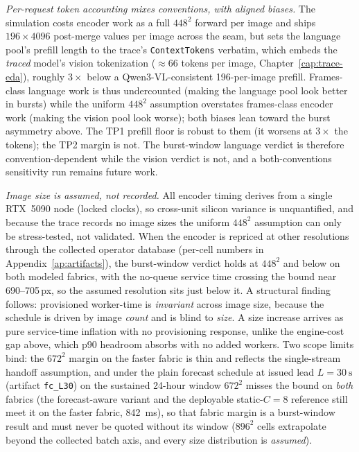 \emph{Per-request token accounting mixes conventions, with aligned biases.}
The simulation costs encoder work as a full $448^2$ forward per image and
ships $196 \times 4096$ post-merge values per image across the seam, but
sets the language pool's prefill length to the trace's
\texttt{ContextTokens} verbatim, which embeds the \emph{traced} model's
vision tokenization (${\approx}66$ tokens per image,
Chapter~\ref{cap:trace-eda}), roughly $3\times$ below a Qwen3-VL-consistent
196-per-image prefill. Frames-class language work is thus undercounted
(making the language pool look better in bursts) while the uniform $448^2$
assumption overstates frames-class encoder work (making the vision pool look
worse); both biases lean toward the burst asymmetry above. The TP1 prefill
floor is robust to them (it worsens at $3\times$ the tokens); the TP2 margin
is not. The burst-window language verdict is therefore
convention-dependent while the vision verdict is not, and a
both-conventions sensitivity run remains future work.

\emph{Image size is assumed, not recorded.} All encoder timing derives from
a single RTX~5090 node (locked clocks), so cross-unit silicon variance is
unquantified, and because the trace records no image sizes the uniform
$448^2$ assumption can only be stress-tested, not validated. When the
encoder is repriced at other resolutions through the collected operator
database (per-cell numbers in Appendix~\ref{ap:artifacts}), the
burst-window verdict holds at $448^2$
and below on both modeled fabrics, with the no-queue service time crossing
the bound near 690--705\,px, so the assumed resolution sits just below it.
A structural finding follows: provisioned worker-time is
\emph{invariant} across image size, because the schedule is driven by image
\emph{count} and is blind to \emph{size}. A size increase arrives as pure
service-time inflation with no provisioning response, unlike the engine-cost
gap above, which p90 headroom absorbs with no added workers. Two scope
limits bind: the $672^2$ margin on the faster fabric is thin and reflects
the single-stream handoff assumption, and under the plain forecast schedule
at issued lead $L{=}\SI{30}{\second}$ (artifact \texttt{fc\_L30}) on the
sustained 24-hour window $672^2$ misses the bound
on \emph{both} fabrics (the forecast-aware variant and the deployable
static-$C{=}8$ reference still meet it on the faster fabric,
\SI{842}{\milli\second}), so that fabric margin is a burst-window result
and must never be quoted without its window ($896^2$ cells extrapolate
beyond the collected batch axis, and every size distribution is
\emph{assumed}).

